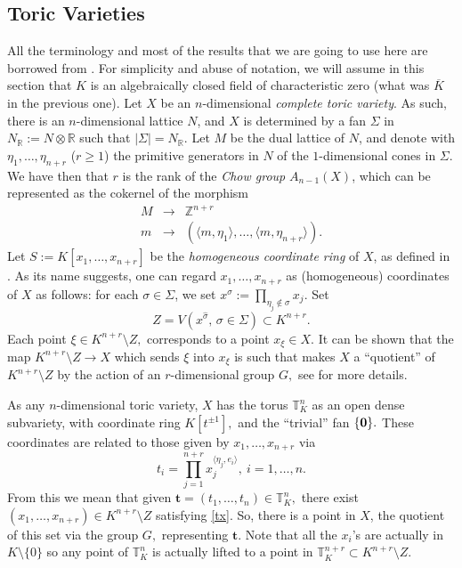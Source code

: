 \documentclass[a4paper,11pt]{amsart}
\newcommand{\R}{\mathbb{R}}
\newcommand{\T}{\mathbb{T}}
\newcommand{\Z}{\mathbb{Z}}
\newcommand{\bft}{{\boldsymbol{t}}}
\numberwithin{thm}{section}
\numberwithin{equation}{section}
\theoremstyle{definition}
\theoremstyle{plain}
\begin{document}
\subsection{Toric Varieties}
 All the terminology and most of the results that we are going to use here are borrowed from \cite{CLS11}. For simplicity and abuse of notation, we will assume in this section that $K$ is an algebraically closed field of characteristic zero (what was $\overline{K}$ in the previous one).  Let $X$ be an $n$-dimensional {\em complete  toric variety}. As such, there is an $n$-dimensional lattice $N$, and $X$ is determined by a fan $\Sigma$  in $N_\R:=N\otimes\R$ such that  $|\Sigma|=N_\R.$
Let $M$ be the dual lattice of $N$, and denote with $\eta_1,\ldots, \eta_{n+r}$ ($r\geq1$) the primitive generators in $N$ of the $1$-dimensional cones in $\Sigma.$ We have then that  $r$ is the rank of the {\em Chow group} $A_{n-1}(X)$, which can be represented as the cokernel of the morphism
\begin{equation}\label{cok}
\begin{array}{ccl}
M & \to & \Z^{n+r}\\
m & \to &(\langle m,\eta_1\rangle ,\ldots, \langle m,\eta_{n+r}\rangle).
\end{array}
\end{equation}
Let $S:=K[x_1,\ldots, x_{n+r}]$ be the {\em homogeneous coordinate ring} of $X$, as defined in \cite{cox95}. As its name suggests, one can regard $x_1,\ldots, x_{n+r}$ as (homogeneous) coordinates of $X$ as follows: for each $\sigma\in\Sigma$, we set $x^{\widehat{\sigma}}:=\prod_{\eta_j\notin\sigma} x_j.$ Set  \begin{equation}\label{z}Z=V(x^{\widehat{\sigma}},\, \sigma\in\Sigma)\subset K^{n+r}.\end{equation} Each point  $\xi\in K^{n+r}\setminus Z,$  corresponds to a point $x_\xi\in X.$
It can be shown that the map $K^{n+r}\setminus Z\to X$ which sends $\xi$ into $x_\xi$ is such that makes $X$ a ``quotient'' of $K^{n+r}\setminus Z$ by the action of an $r$-dimensional group $G,$ see \cite{cox95} for more details.

As any $n$-dimensional toric variety, $X$ has  the torus $\T_{{K}}^n$ as an open dense subvariety, with coordinate ring $K[t^{\pm1}],$ and the ``trivial'' fan $\{\bf0\}.$ These coordinates are related to those given by $x_1,\ldots, x_{n+r}$ via
\begin{equation}\label{tx}
t_i=\prod_{j=1}^{n+r} x_j^{\langle\eta_j,e_i\rangle}, \ i=1,\ldots, n.
\end{equation}
From this we mean that given $\bft=(t_1,\ldots,t_n)\in\T_{{K}}^n,$ there exist $(x_1,\ldots, x_{n+r})\in K^{n+r}\setminus Z$ satisfying \eqref{tx}. So, there is a point in $X$, the quotient of this set via the group $G,$ representing $\bft.$ Note that all the $x_i$'s are actually in $K\setminus\{0\}$ so any point of $\T_{{K}}^n$ is actually lifted to a point in $\T_{{K}}^{n+r}\subset K^{n+r}\setminus Z.$
\end{document}
